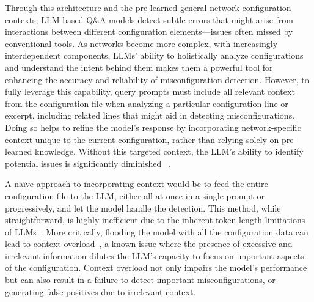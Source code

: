 Through this architecture and the pre-learned general network configuration contexts, LLM-based Q\&A models detect subtle errors that might arise from interactions between different configuration elements—issues often missed by conventional tools. As networks become more complex, with increasingly interdependent components, LLMs' ability to holistically analyze configurations and understand the intent behind them makes them a powerful tool for enhancing the accuracy and reliability of misconfiguration detection.
However, to fully leverage this capability, query
prompts must include all relevant context from the configuration file
when analyzing a particular configuration line or excerpt,
including related lines that might aid in detecting misconfigurations. 
Doing so helps to refine the model's response by incorporating network-specific context unique to the current configuration, rather than relying solely on pre-learned knowledge. Without this targeted context, the LLM's ability to identify potential issues is significantly diminished ~\cite{liskavets2024prompt,tian2024examining,khurana2024and, shvartzshnaider2024llm}.

A na\"{i}ve approach to incorporating context would be to feed the entire
configuration file to the LLM, either all at once in a single prompt or
progressively, and let the model handle the detection. This method, while
straightforward, is highly inefficient due to the inherent token length
limitations of LLMs~\cite{xue2024repeat,yu2024breaking,gu2023mamba}. More
critically, flooding the model with all the configuration data can lead to
context overload~\cite{lican,li2024long,qian2024long}, a known issue where the
presence of excessive and irrelevant information dilutes the LLM’s capacity to
focus on important aspects of the configuration. Context overload not only
impairs the model’s performance but
can also result in a failure to detect important misconfigurations, or generating false positives
due to irrelevant context. 

